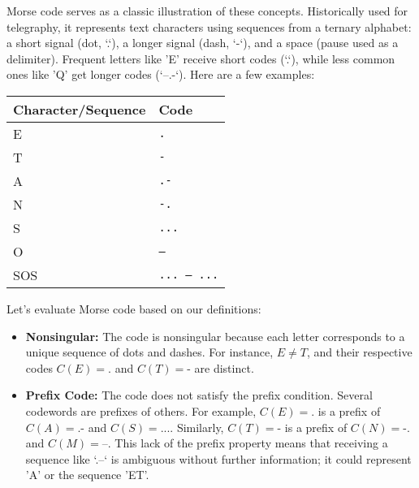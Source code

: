 \begin{example}\label{ex:morse_code}
    Morse code serves as a classic illustration of these concepts. Historically used for telegraphy, it represents text characters using sequences from a ternary alphabet: a short signal (dot, `.`), a longer signal (dash, `-`), and a space (pause used as a delimiter). Frequent letters like 'E' receive short codes (`.`), while less common ones like 'Q' get longer codes (`--.-`). Here are a few examples:
    \begin{center}
        \begin{tabular}{ll}
            \textbf{Character/Sequence} & \textbf{Code}        \\ \hline
            E                           & \texttt{.}           \\
            T                           & \texttt{-}           \\
            A                           & \texttt{.-}          \\
            N                           & \texttt{-.}          \\
            S                           & \texttt{...}         \\
            O                           & \texttt{---}         \\
            SOS                         & \texttt{... --- ...} \\
        \end{tabular}
    \end{center}
    Let's evaluate Morse code based on our definitions:
    \begin{itemize}
        \item \textbf{Nonsingular:} The code is nonsingular because each letter corresponds to a unique sequence of dots and dashes. For instance, $E \neq T$, and their respective codes $C(E) = \texttt{.}$ and $C(T) = \texttt{-}$ are distinct.
        \item \textbf{Prefix Code:} The code does not satisfy the prefix condition. Several codewords are prefixes of others. For example, $C(E) = \texttt{.}$ is a prefix of $C(A) = \texttt{.-}$ and $C(S) = \texttt{...}$. Similarly, $C(T) = \texttt{-}$ is a prefix of $C(N) = \texttt{-.}$ and $C(M) = \texttt{--}$. This lack of the prefix property means that receiving a sequence like `.--` is ambiguous without further information; it could represent 'A' or the sequence 'ET'.

\end{itemize}
\end{example}
